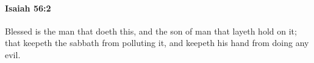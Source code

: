 
		\paragraph{Isaiah 56:2} %
			\label{ISAIAH-56-2}

			Blessed is the man that doeth this, and the son of man that layeth hold on it; that keepeth the sabbath from polluting it, and keepeth his hand from doing any evil.


